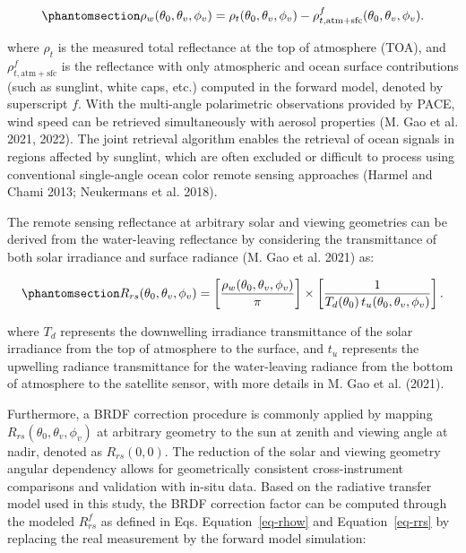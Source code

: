 \documentclass[
  letterpaper,
  open=any]{scrbook}
\begin{document}
\begin{equation}\phantomsection\label{eq-rhow}{
\rho_w(\theta_0,\theta_v,\phi_v)
=
\rho_t(\theta_0,\theta_v,\phi_v)
-
\rho^{f}_{t,\mathrm{atm+sfc}}(\theta_0,\theta_v,\phi_v).
}\end{equation}

where \(\rho_t\) is the measured total reflectance at the top of
atmosphere (TOA), and \(\rho^{f}_{t,\mathrm{atm+sfc}}\) is the
reflectance with only atmospheric and ocean surface contributions (such
as sunglint, white caps, etc.) computed in the forward model, denoted by
superscript \(f\). With the multi-angle polarimetric observations
provided by PACE, wind speed can be retrieved simultaneously with
aerosol properties (M. Gao et al. 2021, 2022). The joint retrieval
algorithm enables the retrieval of ocean signals in regions affected by
sunglint, which are often excluded or difficult to process using
conventional single-angle ocean color remote sensing approaches (Harmel
and Chami 2013; Neukermans et al. 2018).

The remote sensing reflectance at arbitrary solar and viewing geometries
can be derived from the water-leaving reflectance by considering the
transmittance of both solar irradiance and surface radiance (M. Gao et
al. 2021) as:

\begin{equation}\phantomsection\label{eq-rrs}{
R_{rs}(\theta_0,\theta_v,\phi_v)
=
\left[
\frac{\rho_w(\theta_0,\theta_v,\phi_v)}{\pi}
\right]
\times
\left[
\frac{1}
{T_d(\theta_0)\,t_u(\theta_0,\theta_v,\phi_v)}
\right].
}\end{equation}

where \(T_d\) represents the downwelling irradiance transmittance of the
solar irradiance from the top of atmosphere to the surface, and \(t_u\)
represents the upwelling radiance transmittance for the water-leaving
radiance from the bottom of atmosphere to the satellite sensor, with
more details in M. Gao et al. (2021).

Furthermore, a BRDF correction procedure is commonly applied by mapping
\(R_{rs}(\theta_0, \theta_v, \phi_v)\) at arbitrary geometry to the sun
at zenith and viewing angle at nadir, denoted as \(R_{rs}(0,0)\). The
reduction of the solar and viewing geometry angular dependency allows
for geometrically consistent cross-instrument comparisons and validation
with in-situ data. Based on the radiative transfer model used in this
study, the BRDF correction factor can be computed through the modeled
\(R_{rs}^f\) as defined in Eqs. Equation~\ref{eq-rhow} and
Equation~\ref{eq-rrs} by replacing the real measurement by the forward
model simulation:
\end{document}
